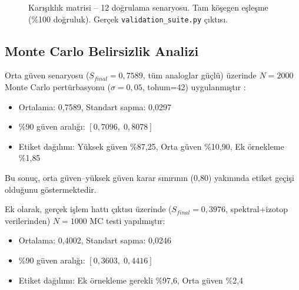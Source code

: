 \documentclass[12pt,a4paper]{article}
\begin{document}
\begin{figure}[ht]
\caption{Karışıklık matrisi -- 12 doğrulama senaryosu. Tam köşegen eşleşme (\%100 doğruluk). Gerçek \texttt{validation\_suite.py} çıktısı.}
\label{fig:confusion}
\end{figure}

\subsection{Monte Carlo Belirsizlik Analizi}

Orta güven senaryosu ($S_{final} = 0{,}7589$, tüm analoglar güçlü) üzerinde $N = 2000$ Monte Carlo pertürbasyonu ($\sigma = 0{,}05$, tohum=42) uygulanmıştır \cite{metropolis1949}:

\begin{itemize}
    \item Ortalama: 0{,}7589, Standart sapma: 0{,}0297
    \item \%90 güven aralığı: $[0{,}7096,\; 0{,}8078]$
    \item Etiket dağılımı: Yüksek güven \%87{,}25, Orta güven \%10{,}90, Ek örnekleme \%1{,}85
\end{itemize}

Bu sonuç, orta güven--yüksek güven karar sınırının (0{,}80) yakınında etiket geçişi olduğunu göstermektedir.

Ek olarak, gerçek işlem hattı çıktısı üzerinde ($S_{final} = 0{,}3976$, spektral+izotop verilerinden) $N = 1000$ MC testi yapılmıştır:
\begin{itemize}
    \item Ortalama: 0{,}4002, Standart sapma: 0{,}0246
    \item \%90 güven aralığı: $[0{,}3603,\; 0{,}4416]$
    \item Etiket dağılımı: Ek örnekleme gerekli \%97{,}6, Orta güven \%2{,}4
\end{itemize}
\end{document}
